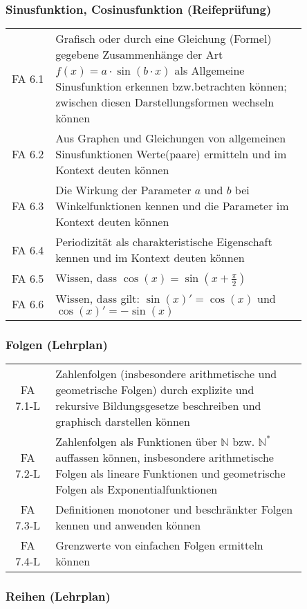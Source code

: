 \documentclass[a4paper,12pt]{article}
\begin{document}
\subsubsection{Sinusfunktion, Cosinusfunktion (Reifeprüfung)}
\begin{tabular}{cp{0.85\linewidth}}
FA 6.1 & Grafisch oder durch eine Gleichung (Formel) gegebene Zusammenhänge der Art $f(x) = a\cdot \sin(b\cdot x)$ als Allgemeine Sinusfunktion erkennen bzw.betrachten können; zwischen diesen Darstellungsformen wechseln können\\
FA 6.2 & Aus Graphen und Gleichungen von allgemeinen Sinusfunktionen Werte(paare) ermitteln und im Kontext deuten können\\
FA 6.3 & Die Wirkung der Parameter $a$ und $b$ bei Winkelfunktionen kennen und die Parameter im Kontext deuten können\\
FA 6.4 & Periodizität als charakteristische Eigenschaft kennen und im Kontext deuten können\\
FA 6.5 & Wissen, dass $\cos(x)=\sin(x+\frac{\pi}{2})$\\
FA 6.6 & Wissen, dass gilt: $\sin(x)'=\cos(x)$ und $\cos(x)'=-\sin(x)$
\end{tabular}

\subsubsection{Folgen (Lehrplan)}
\begin{em}
\begin{tabular}{cp{0.85\linewidth}}
FA 7.1-L & Zahlenfolgen (insbesondere arithmetische und geometrische Folgen) durch explizite und rekursive Bildungsgesetze beschreiben und graphisch darstellen können\\
FA 7.2-L & Zahlenfolgen als Funktionen über $\mathbb{N}$ bzw. $\mathbb{N}^*$ auffassen können, insbesondere arithmetische Folgen als lineare Funktionen und geometrische Folgen als Exponentialfunktionen \\
FA 7.3-L & Definitionen monotoner und beschränkter Folgen kennen und anwenden können\\
FA 7.4-L & Grenzwerte von einfachen Folgen ermitteln können\\
\end{tabular}

\end{em}

\subsubsection{Reihen (Lehrplan)}
\end{document}

